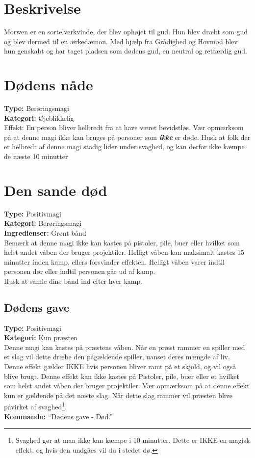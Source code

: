 \section*{Beskrivelse}
Morwen er en sortelverkvinde, der blev ophøjet til gud. Hun blev dræbt som gud og blev dermed til en ærkedæmon. Med hjælp fra Grådighed og Hovmod blev hun genskabt og har taget pladsen som dødens gud, en neutral og retfærdig gud.\\

\section*{Dødens nåde}
\textbf{Type:} Berøringsmagi\\
\textbf{Kategori:} Øjeblikkelig\\
Effekt: En person bliver helbredt fra at have været bevidstløs. Vær opmærksom på at denne magi ikke kan bruges på personer som \textbf{\textit{ikke}} er døde. Husk at folk der er helbredt af denne magi stadig lider under svaghed, og kan derfor ikke kæmpe de næste 10 minutter

\section*{Den sande død}
\textbf{Type:} Positivmagi\\
\textbf{Kategori:} Berøringsmagi\\
\textbf{Ingredienser:} Grønt bånd\\
Bemærk at denne magi ikke kan kastes på pistoler, pile, buer eller hvilket som helst andet våben der bruger projektiler. Helligt våben kan maksimalt kastes 15 minutter inden kamp, ellers forsvinder effekten. Helligt våben varer indtil personen dør eller indtil personen går ud af kamp.\\ Husk at samle
dine bånd ind efter hver kamp.\\
\subsection*{Dødens gave}
\textbf{Type:} Positivmagi\\
\textbf{Kategori:} Kun præsten\\
Denne magi kan kastes på præstens våben. Når en præst rammer en spiller med et slag vil dette dræbe den pågældende spiller, uanset deres mængde af liv.
Denne effekt gælder IKKE hvis personen bliver ramt på et skjold, og vil også blive brugt. Denne effekt kan ikke kastes på Pistoler, pile, buer eller et hvilket som helst andet våben der bruger projektiler. Vær opmærksom på at denne effekt kun er gældende på det næste slag. Når dette slag rammer vil præsten blive påvirket af svaghed\footnote{Svaghed gør at man ikke kan kæmpe i 10 minutter. Dette er IKKE en magisk effekt, og hvis den undgåes vil du i stedet dø.}.\\
\textbf{Kommando:} “Dødens gave - Død.”

